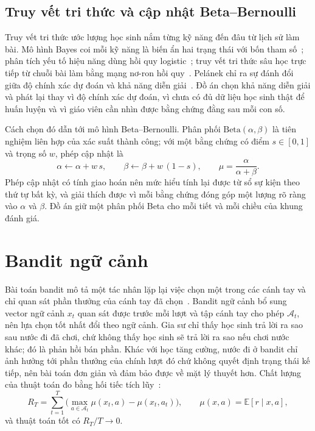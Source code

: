 \subsection{Truy vết tri thức và cập nhật Beta--Bernoulli}\label{sec:beta-ref}
Truy vết tri thức ước lượng học sinh nắm từng kỹ năng đến đâu từ lịch sử làm bài. Mô hình Bayes coi mỗi kỹ năng là biến ẩn hai trạng thái với bốn tham số~\cite{corbett1995}; phân tích yếu tố hiệu năng dùng hồi quy logistic~\cite{pavlik2009}; truy vết tri thức sâu học trực tiếp từ chuỗi bài làm bằng mạng nơ-ron hồi quy~\cite{piech2015}. Pelánek chỉ ra sự đánh đổi giữa độ chính xác dự đoán và khả năng diễn giải~\cite{pelanek2017}. Đồ án chọn khả năng diễn giải và phát lại thay vì độ chính xác dự đoán, vì chưa có đủ dữ liệu học sinh thật để huấn luyện và vì giáo viên cần nhìn được bằng chứng đằng sau mỗi con số.

Cách chọn đó dẫn tới mô hình Beta--Bernoulli. Phân phối $\mathrm{Beta}(\alpha,\beta)$ là tiên nghiệm liên hợp của xác suất thành công; với một bằng chứng có điểm $s\in[0,1]$ và trọng số $w$, phép cập nhật là
\begin{equation}
\alpha\leftarrow\alpha+w\,s,\qquad \beta\leftarrow\beta+w\,(1-s),\qquad \mu=\frac{\alpha}{\alpha+\beta}.
\label{eq:beta}
\end{equation}
Phép cập nhật có tính giao hoán nên mức hiểu tính lại được từ sổ sự kiện theo thứ tự bất kỳ, và giải thích được vì mỗi bằng chứng đóng góp một lượng rõ ràng vào $\alpha$ và $\beta$. Đồ án giữ một phân phối Beta cho mỗi tiết và mỗi chiều của khung đánh giá.

\section{Bandit ngữ cảnh}\label{sec:bandit-theory}
Bài toán bandit mô tả một tác nhân lặp lại việc chọn một trong các cánh tay và chỉ quan sát phần thưởng của cánh tay đã chọn~\cite{auer2002}. Bandit ngữ cảnh bổ sung vector ngữ cảnh $x_t$ quan sát được trước mỗi lượt và tập cánh tay cho phép $\mathcal{A}_t$, nên lựa chọn tốt nhất đổi theo ngữ cảnh. Gia sư chỉ thấy học sinh trả lời ra sao sau nước đi đã chơi, chứ không thấy học sinh sẽ trả lời ra sao nếu chơi nước khác; đó là phản hồi bán phần. Khác với học tăng cường, nước đi ở bandit chỉ ảnh hưởng tới phần thưởng của chính lượt đó chứ không quyết định trạng thái kế tiếp, nên bài toán đơn giản và đảm bảo được về mặt lý thuyết hơn. Chất lượng của thuật toán đo bằng hối tiếc tích lũy~\cite{lattimore2020}:
\begin{equation}
R_T=\sum_{t=1}^{T}\Big(\max_{a\in\mathcal{A}_t}\mu(x_t,a)-\mu(x_t,a_t)\Big),\qquad \mu(x,a)=\mathbb{E}[r\mid x,a],
\label{eq:regret}
\end{equation}
và thuật toán tốt có $R_T/T\to0$.

